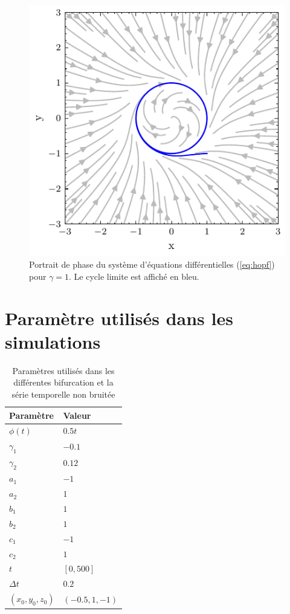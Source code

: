 \begin{figure}[H]
  \centering
  \includegraphics{figures/phase-plot.pdf}
  \caption{Portrait de phase du système d'équations différentielles (\ref{eq:hopf}) pour $\gamma = 1$. Le cycle limite est affiché en bleu.}
  \label{fig:phase-plot}
\end{figure}

\section{Paramètre utilisés dans les simulations}

\begin{table}[H]
\centering
\begin{tabular}{|l|l|}
  \hline
  Paramètre         & Valeur \\\hline
  $\phi(t)$         & $0.5t$ \\
  $\gamma_1$        & $-0.1$ \\
  $\gamma_2$        & $0.12$ \\
  $a_1$             & $-1$ \\
  $a_2$             & $1$ \\
  $b_1$             & $1$ \\
  $b_2$             & $1$ \\
  $c_1$             & $-1$ \\
  $c_2$             & $1$ \\
  $t$               & $[0, 500]$ \\
  $\Delta t$        & $0.2$ \\
  $(x_0, y_0, z_0)$ & $(-0.5, 1, -1)$ \\\hline
\end{tabular}
\caption{Paramètres utilisés dans les différentes bifurcation et la série temporelle non bruitée}
\label{tab:basic-parameters}
\end{table}

